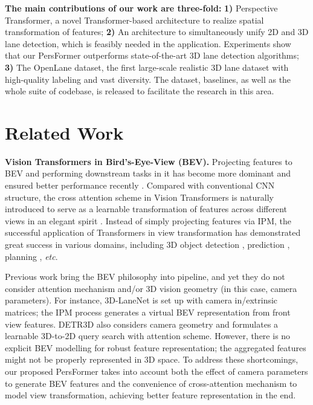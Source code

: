 \documentclass[runningheads]{llncs}
\begin{document}
\textbf{The main contributions of our work are three-fold:}
\textbf{1)}
Perspective Transformer, a novel Transformer-based architecture to realize spatial transformation of features;
\textbf{2)} An architecture to simultaneously unify 2D and 3D lane detection, which is feasibly needed in the application. Experiments show that our PersFormer outperforms state-of-the-art 3D lane detection algorithms;
\textbf{3)} The OpenLane dataset, the first large-scale realistic 3D lane dataset with high-quality labeling and vast diversity. The dataset, baselines, as well as the whole suite of codebase, is released to facilitate the research in this area.














\section{Related Work}\label{sec: related work}

\textbf{Vision Transformers in Bird's-Eye-View (BEV).}
Projecting features to BEV and performing downstream tasks in it has become more dominant and ensured better performance recently \cite{patric2021blog}. Compared with conventional CNN structure, the cross attention scheme in Vision Transformers \cite{vaswani2017attention,dosovitskiy2021an,carion2020end,liu2021swin,zhu2021deformable} is 
{naturally introduced to serve as a learnable transformation of features across different views in an elegant spirit \cite{patric2021blog}. 
}
{Instead of simply projecting features via IPM, the successful application of Transformers in view transformation has demonstrated great success in various domains, including 3D object detection \cite{yin2020lidar,wang2022detr3d,guan2022m3detr,li2022bevformer}, prediction \cite{gao2020vectornet,gu2021densetnt,ngiam2021scene}, planning \cite{prakash2021multi,chitta2021neat}, \textit{etc}. }


Previous work \cite{Garnett_2019_ICCV,yang2021projecting,wang2022detr3d,saha2021translating,can2021structured} bring the BEV philosophy into pipeline, and yet they do not consider attention mechanism and/or 3D vision geometry (in this case, camera parameters).
For instance, 3D-LaneNet \cite{Garnett_2019_ICCV} is set up with camera in/extrinsic matrices; the IPM process generates a virtual BEV representation from front view features.
{DETR3D} \cite{wang2022detr3d} also considers camera geometry 
and formulates a learnable 3D-to-2D query search with attention scheme.
However, there is no explicit BEV modelling for robust feature representation; 
{the aggregated features might not be properly represented in 3D space.}
{To address these shortcomings, our proposed PersFormer takes into account both the effect of camera parameters 
to generate BEV features 
and the convenience of cross-attention mechanism to model view transformation, 
achieving better feature representation in the end.}
\end{document}
